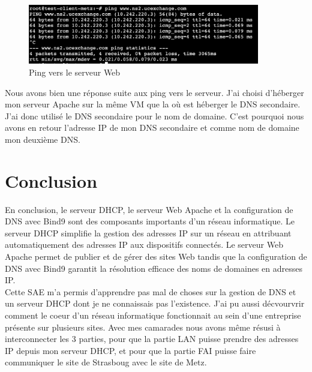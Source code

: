 \documentclass[12pt, a4paper]{article}
\begin{document}
\begin{figure}[h]
    \centering
    \includegraphics[width=0.9\textwidth]{img/web.png}
    \caption{Ping vers le serveur Web}
    \label{fig:web}
\end{figure}

Nous avons bien une réponse suite aux ping vers le serveur. J'ai choisi d'héberger
mon serveur Apache sur la même VM que la où est héberger le DNS secondaire. J'ai donc
utilisé le DNS secondaire pour le nom de domaine. C'est pourquoi nous avons 
en retour l'adresse IP de mon DNS secondaire et comme nom de domaine mon deuxième
DNS. 

\section{Conclusion}

En conclusion, le serveur DHCP, le serveur Web Apache et la 
configuration de DNS avec Bind9 sont des composants importants 
d'un réseau informatique. Le serveur DHCP simplifie la gestion des 
adresses IP sur un réseau en attribuant automatiquement des adresses 
IP aux dispositifs connectés. Le serveur Web Apache permet de publier 
et de gérer des sites Web tandis que la configuration de DNS avec Bind9 
garantit la résolution efficace des noms de domaines en adresses IP.\\

Cette SAE m'a permis d'apprendre pas mal de choses sur la gestion de DNS et 
un serveur DHCP dont je ne connaissais pas l'existence. J'ai pu aussi décvourvrir
comment le coeur d'un réseau informatique fonctionnait au sein d'une entreprise
présente sur plusieurs sites. Avec mes camarades nous avons même résusi à 
interconnecter les 3 parties, pour que la partie LAN puisse prendre des adresses
IP depuis mon serveur DHCP, et pour que la partie FAI puisse faire communiquer le site 
de Strasboug avec le site de Metz.
\end{document}
